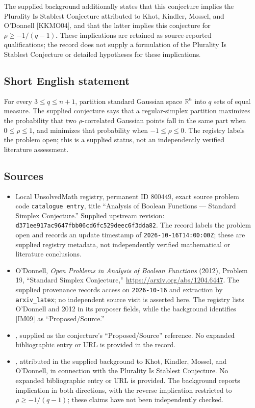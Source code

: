 \documentclass[11pt]{article}
\newcommand{\R}{\mathbb{R}}
\begin{document}
The supplied background additionally states that this conjecture implies the Plurality Is Stablest Conjecture attributed to Khot, Kindler, Mossel, and O'Donnell [KKMO04], and that the latter implies this conjecture for \(\rho\geq-1/(q-1)\). These implications are retained as source-reported qualifications; the record does not supply a formulation of the Plurality Is Stablest Conjecture or detailed hypotheses for these implications.
\subsection{Short English statement}
For every \(3\leq q\leq n+1\), partition standard Gaussian space \(\R^n\) into \(q\) sets of equal measure. The supplied conjecture says that a regular-simplex partition maximizes the probability that two \(\rho\)-correlated Gaussian points fall in the same part when \(0\leq\rho\leq1\), and minimizes that probability when \(-1\leq\rho\leq0\). The registry labels the problem open; this is a supplied status, not an independently verified literature assessment.
\subsection{Sources}
\begin{itemize}
\item Local UnsolvedMath registry, permanent ID \(800449\), exact source problem code \texttt{catalogue entry}, title ``Analysis of Boolean Functions --- Standard Simplex Conjecture.'' Supplied upstream revision: \texttt{d371ee917ac9647fbb06cd6fc529deec6f3dda82}. The record labels the problem open and records an update timestamp of \texttt{2026-10-16T14:00:00Z}; these are supplied registry metadata, not independently verified mathematical or literature conclusions.
\item O'Donnell, \emph{Open Problems in Analysis of Boolean Functions} (2012), Problem 19, ``Standard Simplex Conjecture,'' \url{https://arxiv.org/abs/1204.6447}. The supplied provenance records access on \texttt{2026-10-16} and extraction by \texttt{arxiv\_latex}; no independent source visit is asserted here. The registry lists O'Donnell and 2012 in its proposer fields, while the background identifies [IM09] as ``Proposed/Source.''
\item [IM09], supplied as the conjecture's ``Proposed/Source'' reference. No expanded bibliographic entry or URL is provided in the record.
\item [KKMO04], attributed in the supplied background to Khot, Kindler, Mossel, and O'Donnell, in connection with the Plurality Is Stablest Conjecture. No expanded bibliographic entry or URL is provided. The background reports implication in both directions, with the reverse implication restricted to \(\rho\geq-1/(q-1)\); these claims have not been independently checked.
\end{itemize}
\end{document}
